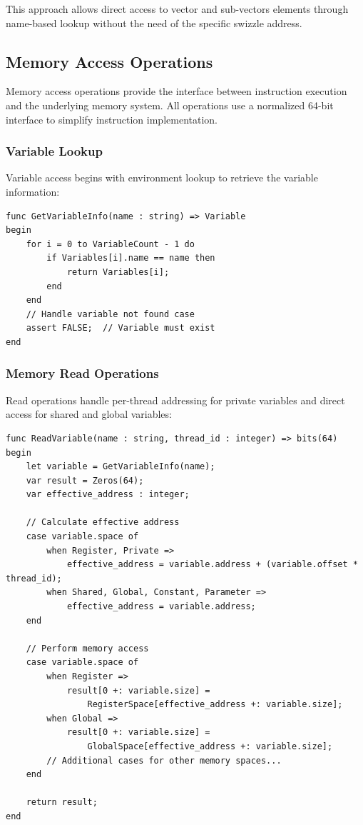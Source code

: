 This approach allows direct access to vector and sub-vectors elements through
name-based lookup without the need of the specific swizzle address.

\subsection{Memory Access Operations}
\label{subsec:memory_access}

Memory access operations provide the interface between instruction execution
and the underlying memory system. All operations use a normalized 64-bit
interface to simplify instruction implementation.

\subsubsection{Variable Lookup}
Variable access begins with environment lookup to retrieve the variable information:

\begin{lstlisting}[caption={Variable Environment Lookup}, label={lst:variable_lookup}]
func GetVariableInfo(name : string) => Variable
begin
    for i = 0 to VariableCount - 1 do
        if Variables[i].name == name then
            return Variables[i];
        end
    end
    // Handle variable not found case
    assert FALSE;  // Variable must exist
end
\end{lstlisting}

\subsubsection{Memory Read Operations}
Read operations handle per-thread addressing for private variables and direct
access for shared and global variables:

\begin{lstlisting}[caption={Memory Read Implementation}, label={lst:memory_read}]
func ReadVariable(name : string, thread_id : integer) => bits(64)
begin
    let variable = GetVariableInfo(name);
    var result = Zeros(64);
    var effective_address : integer;

    // Calculate effective address
    case variable.space of
        when Register, Private =>
            effective_address = variable.address + (variable.offset * thread_id);
        when Shared, Global, Constant, Parameter =>
            effective_address = variable.address;
    end

    // Perform memory access
    case variable.space of
        when Register =>
            result[0 +: variable.size] = 
                RegisterSpace[effective_address +: variable.size];
        when Global =>
            result[0 +: variable.size] = 
                GlobalSpace[effective_address +: variable.size];
        // Additional cases for other memory spaces...
    end

    return result;
end
\end{lstlisting}

